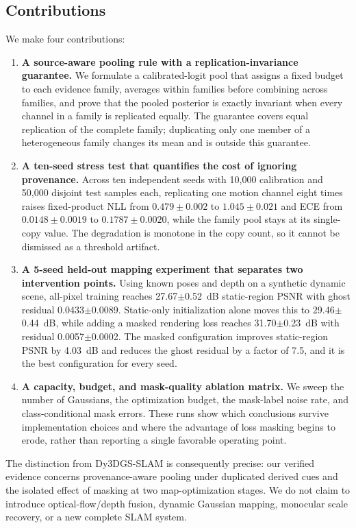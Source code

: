 \documentclass[10pt,conference]{IEEEtran}
\begin{document}
\subsection{Contributions}
We make four contributions:
\begin{enumerate}
\item \textbf{A source-aware pooling rule with a replication-invariance guarantee.} We formulate a calibrated-logit pool that assigns a fixed budget to each evidence family, averages within families before combining across families, and prove that the pooled posterior is exactly invariant when every channel in a family is replicated equally. The guarantee covers equal replication of the complete family; duplicating only one member of a heterogeneous family changes its mean and is outside this guarantee.
\item \textbf{A ten-seed stress test that quantifies the cost of ignoring provenance.} Across ten independent seeds with 10,000 calibration and 50,000 disjoint test samples each, replicating one motion channel eight times raises fixed-product NLL from $0.479\pm0.002$ to $1.045\pm0.021$ and ECE from $0.0148\pm0.0019$ to $0.1787\pm0.0020$, while the family pool stays at its single-copy value. The degradation is monotone in the copy count, so it cannot be dismissed as a threshold artifact.
\item \textbf{A 5-seed held-out mapping experiment that separates two intervention points.} Using known poses and depth on a synthetic dynamic scene, all-pixel training reaches 27.67$\pm$0.52~dB static-region PSNR with ghost residual 0.0433$\pm$0.0089. Static-only initialization alone moves this to 29.46$\pm$0.44~dB, while adding a masked rendering loss reaches 31.70$\pm$0.23~dB with residual 0.0057$\pm$0.0002. The masked configuration improves static-region PSNR by 4.03~dB and reduces the ghost residual by a factor of 7.5, and it is the best configuration for every seed.
\item \textbf{A capacity, budget, and mask-quality ablation matrix.} We sweep the number of Gaussians, the optimization budget, the mask-label noise rate, and class-conditional mask errors. These runs show which conclusions survive implementation choices and where the advantage of loss masking begins to erode, rather than reporting a single favorable operating point.
\end{enumerate}

The distinction from Dy3DGS-SLAM is consequently precise: our verified evidence concerns provenance-aware pooling under duplicated derived cues and the isolated effect of masking at two map-optimization stages. We do not claim to introduce optical-flow/depth fusion, dynamic Gaussian mapping, monocular scale recovery, or a new complete SLAM system.
\end{document}
